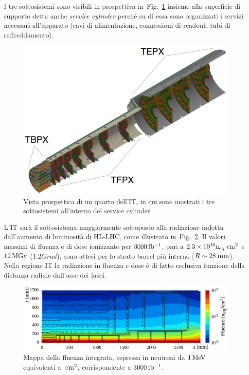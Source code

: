  I tre sottosistemi sono visibili in prospettiva in~Fig.~\ref{fig:ITPerspectiveView} insieme alla superficie di supporto detta anche {\em service cylinder} perch\`e su di essa sono organizzati i servizi necessari all'apparato (cavi di alimentazione, connessioni di readout, tubi di raffreddamento). 
\begin{figure}
\centering
\includegraphics[width=0.99\textwidth]{Immagini/ITPerspectiveView.PNG}
\caption{Vista prospettica di un quarto dell'IT, in cui sono mostrati i tre sottosistemi all'interno del service cylinder.}
\label{fig:ITPerspectiveView}
\end{figure}


L'IT sar\`a il sottosistema maggiormente sottoposto alla radiazione indotta dall'aumento di luminosit\`a di HL-LHC, come illustrato in~Fig.~\ref{fig:fluencemap}. Il valori massimi di fluenza e di dose ionizzante per $3000{\rm \, fb^{-1}}$, pari a $2.3 \times 10^{16} \mathrm{n_{eq}\rm \; cm^2}$ e $12{\rm \, MGy}$ ($1.2 Grad$), sono attesi per lo strato barrel pi\`u interno ($R\sim28\rm \; mm$). Nella regione IT la radiazione in fluenza e dose \`e di fatto esclusiva funzione della distanza radiale dall'asse dei fasci. 
\begin{figure}
\centering
\includegraphics[width=0.99\textwidth]{Immagini/HLLHC_Fluence.PNG}
\caption{Mappa della fluenza integrata, espressa in neutroni da $1{\rm \, Me\kern-0.125em V}$ equivalenti a $\rm \; cm^2$, corrispondente a $3000{\rm \, fb^{-1}}$.}  
\label{fig:fluencemap}
\end{figure}

